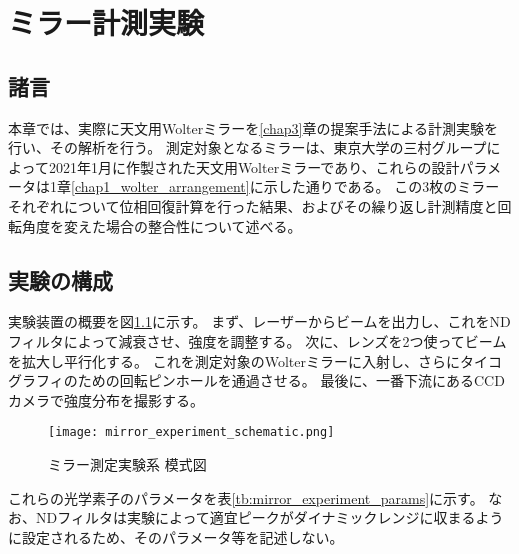 \chapter{ミラー計測実験}
\thispagestyle{empty}
\label{chap5}
\graphicspath{{chap5/figure/}}
\minitoc

\newpage


\section{諸言}
\label{chap5_introduction}

本章では、実際に天文用Wolterミラーを\ref{chap3}章の提案手法による計測実験を行い、その解析を行う。
測定対象となるミラーは、東京大学の三村グループによって2021年1月に作製された天文用Wolterミラーであり、これらの設計パラメータは1章\ref{chap1_wolter_arrangement}に示した通りである。
この3枚のミラーそれぞれについて位相回復計算を行った結果、およびその繰り返し計測精度と回転角度を変えた場合の整合性について述べる。

\clearpage
\newpage

\section{実験の構成}

実験装置の概要を図\ref{fig:mirror_experiment_schematic}に示す。
まず、レーザーからビームを出力し、これをNDフィルタによって減衰させ、強度を調整する。
次に、レンズを2つ使ってビームを拡大し平行化する。
これを測定対象のWolterミラーに入射し、さらにタイコグラフィのための回転ピンホールを通過させる。
最後に、一番下流にあるCCDカメラで強度分布を撮影する。

\begin{figure}[!ht]
\centering
\texttt{[image: mirror\_experiment\_schematic.png]}
\caption{ミラー測定実験系 模式図}
\label{fig:mirror_experiment_schematic}
\end{figure}

これらの光学素子のパラメータを表\ref{tb:mirror_experiment_params}に示す。
なお、NDフィルタは実験によって適宜ピークがダイナミックレンジに収まるように設定されるため、そのパラメータ等を記述しない。

